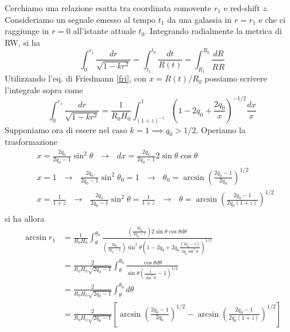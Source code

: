 Cerchiamo una relazione esatta tra coordinata comovente $r_1$ e red-shift $z$.
Consideriamo un segnale emesso al tempo $t_1$ da una galassia in $r=r_1$ e che
ci raggiunge in $r=0$ all'istante attuale $t_0$. Integrando radialmente la
metrica di RW, si ha
\begin{equation}
  \int_0^{r_1} \frac{dr}{\sqrt{1-kr^2}} = \int_{t_1}^{t_0} \frac{dt}{R(t)} =
  \int_{R_1}^{R_0} \frac{dR}{R \dot{R}}
\end{equation}
Utilizzando l'eq. di Friedmann \eqref{fri}, con $x=R(t)/R_0$ possiamo scrivere
l'integrale sopra come
\begin{equation}
  \int_0^{r_1} \frac{dr}{\sqrt{1-kr^2}} = \frac{1}{R_0 H_0}
  \int_{(1+z)^{-1}}^{1} \left(1-2q_0+ \frac{2q_0}{x} \right)^{-1/2} \frac{dx}{x}
\end{equation}
Supponiamo ora di essere nel caso $k=1 \implies q_0>1/2$.  Operiamo la trasformazione
\begin{equation}
  \begin{split}
    & x= \frac{2q_0}{2q_0-1} \sin^2 \theta ~~~\rightarrow~~~ dx = \frac{2q_0}{2q_0-1} 2 \sin \theta \cos \theta \\
    & x=1 ~~~\rightarrow~~~ \frac{2q_0}{2q_0-1} \sin^2 \theta_0 =1 ~~~\rightarrow~~~
    \theta_0= \arcsin \left(\frac{2q_0-1}{2q_0}\right)^{1/2} \\
    & x= \frac{1}{1+z} ~~~\rightarrow~~~ \frac{2q_0}{2q_0-1} \sin^2 \theta= \frac{1}{1+z} ~~~\rightarrow~~~
    \theta = \arcsin \left(\frac{2q_0-1}{2q_0(1+z)}\right)^{1/2} \\
  \end{split}
  \label{posizioni_mattig}
\end{equation}
si ha allora
\begin{equation}
  \begin{split}
    \arcsin r_1 & = \frac{1}{R_0 H_0} \int_{\theta}^{\theta_0}
    \frac{ \left(\frac {2q_0}{2q_0-1}\right)  2 \sin \theta \cos \theta d\theta}
    { \left(\frac{2q_0}{2q_0-1}\right) \sin^2 \theta
      \left( 1-2q_0 + 2q_0 \frac{(2q_0-1)}{ 2q_0 \sin^2 \theta} \right)^{1/2}} \\
    & = \frac{2}{R_0 H_0 \sqrt{2q_0-1}}  \int_{\theta}^{\theta_0}
    \frac{\cos \theta d \theta}{\sin \theta \left(\frac{1}{\sin^2 \theta} -1 \right)^{1/2}} \\
    & = \frac{2}{R_0 H_0 \sqrt{2q_0-1}}  \int_{\theta}^{\theta_0} d \theta \\
    & = \frac{2}{R_0 H_0 \sqrt{2q_0-1}}
    \left[ \arcsin \left(\frac{2q_0-1}{2q_0}\right)^{1/2} -
      \arcsin \left(\frac{2q_0-1}{2q_0(1+z)}\right)^{1/2}  \right]
  \end{split}
\end{equation}
